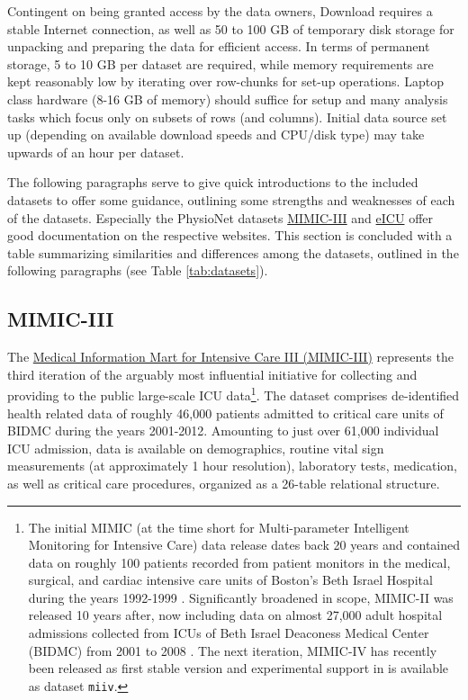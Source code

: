 \documentclass[
  notitle]{jss}
\begin{document}
Contingent on being granted access by the data owners, Download requires
a stable Internet connection, as well as 50 to 100 GB of temporary disk
storage for unpacking and preparing the data for efficient access. In
terms of permanent storage, 5 to 10 GB per dataset are required, while
memory requirements are kept reasonably low by iterating over row-chunks
for set-up operations. Laptop class hardware (8-16 GB of memory) should
suffice for setup and many analysis tasks which focus only on subsets of
rows (and columns). Initial data source set up (depending on available
download speeds and CPU/disk type) may take upwards of an hour per
dataset.

The following paragraphs serve to give quick introductions to the
included datasets to offer some guidance, outlining some strengths and
weaknesses of each of the datasets. Especially the PhysioNet datasets
\href{https://mimic.physionet.org/about/mimic/}{MIMIC-III} and
\href{https://eicu-crd.mit.edu/about/eicu/}{eICU} offer good
documentation on the respective websites. This section is concluded with
a table summarizing similarities and differences among the datasets,
outlined in the following paragraphs (see Table \ref{tab:datasets}).

\hypertarget{mimic-iii}{%
\subsection{MIMIC-III}\label{mimic-iii}}

The \href{https://physionet.org/content/mimiciii/1.4/}{Medical
Information Mart for Intensive Care III (MIMIC-III)} represents the
third iteration of the arguably most influential initiative for
collecting and providing to the public large-scale ICU data\footnote{The
  initial MIMIC (at the time short for Multi-parameter Intelligent
  Monitoring for Intensive Care) data release dates back 20 years and
  contained data on roughly 100 patients recorded from patient monitors
  in the medical, surgical, and cardiac intensive care units of Boston's
  Beth Israel Hospital during the years 1992-1999 \citep{moody1996}.
  Significantly broadened in scope, MIMIC-II was released 10 years
  after, now including data on almost 27,000 adult hospital admissions
  collected from ICUs of Beth Israel Deaconess Medical Center (BIDMC)
  from 2001 to 2008 \citep{lee2011}. The next iteration, MIMIC-IV has
  recently been released as first stable version \citep{johnson2021} and
  experimental support in  is available as dataset
  \texttt{miiv}.}. The dataset comprises de-identified health related
data of roughly 46,000 patients admitted to critical care units of BIDMC
during the years 2001-2012. Amounting to just over 61,000 individual ICU
admission, data is available on demographics, routine vital sign
measurements (at approximately 1 hour resolution), laboratory tests,
medication, as well as critical care procedures, organized as a 26-table
relational structure.
\end{document}
